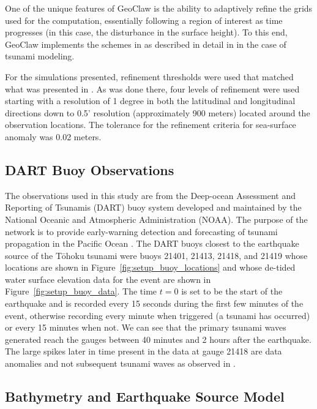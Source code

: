 \documentclass[review,12pt]{elsarticle}
\newcommand{\geoclaw}{{\sc GeoClaw}\xspace}
\newcommand{\tohoku}{T\={o}hoku\xspace}
\begin{document}
One of the unique features of \geoclaw is the ability to adaptively refine the
grids used for the computation, essentially following a region of interest as
time progresses (in this case, the disturbance in the surface height).
To this end, \geoclaw implements the schemes in \cite{Berger:1984ui,Berger:1998aa}
as described in detail in \cite{Berger:2011du} in the case of tsunami
modeling.

For the simulations presented, refinement thresholds were used that matched what
was presented in \cite{MacInnes:2013cr}.  As was done there, four levels of
refinement were used starting with a resolution of 1 degree in both the
latitudinal and longitudinal directions down to 0.5' resolution (approximately
900 meters) located around the observation locations.  The tolerance for the
refinement criteria for sea-surface anomaly was 0.02 meters.

\subsection{DART Buoy Observations}

The observations used in this study are from the Deep-ocean Assessment and
Reporting of Tsunamis (DART) buoy system developed and maintained by the
National Oceanic and Atmospheric Administration (NOAA).  The purpose of the
network is to provide early-warning detection and forecasting of tsunami
propagation in the Pacific Ocean \cite{Milburn:1996wm}.  The DART buoys closest
to the earthquake source of the \tohoku tsunami were buoys 21401, 21413, 21418,
and 21419 whose locations are shown in Figure~\ref{fig:setup_buoy_locations} and
whose de-tided water surface elevation data for the event are shown in
Figure~\ref{fig:setup_buoy_data}. The time $t=0$ is set to be the start of the
earthquake and is recorded every 15 seconds during the first few minutes of the
event, otherwise recording every minute when triggered (a tsunami has occurred)
or every 15 minutes when not.  We can see that the primary tsunami
waves generated reach the gauges between 40 minutes and 2 hours after the
earthquake.  The large spikes later in time present in the data at gauge 21418
are data anomalies and not subsequent tsunami waves as observed in \cite{MacInnes:2013cr}.

\subsection{Bathymetry and Earthquake Source Model}
\end{document}

